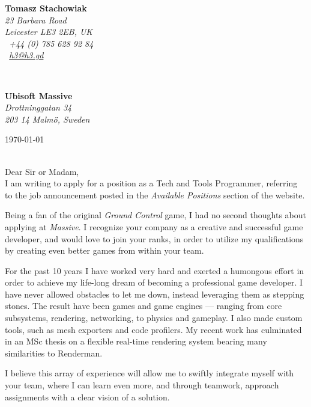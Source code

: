 \documentclass[11pt]{article}
\begin{document}
\hfill%
\begin{minipage}[t]{.6\textwidth}
\raggedleft%
{\bfseries Tomasz Stachowiak}\\[.35ex]
\small\itshape%
23 Barbara Road\\
Leicester LE3 2EB, UK\\[.35ex]
\Telefon~+44 (0) 785 628 92 84\\
\Letter~\href{mailto:h3@h3.gd}{h3@h3.gd}
\end{minipage}\\[1em]
%
\begin{minipage}[t]{.4\textwidth}
\raggedright%
{\bfseries Ubisoft Massive}\\[.35ex]
\small\itshape%
Drottninggatan 34\\
203 14 Malmö, Sweden
\end{minipage}
\hfill %
\begin{minipage}[t]{.4\textwidth}
\raggedleft %
\today
\end{minipage}\\[2em]
Dear Sir or Madam,\\[2.5em]
I am writing to apply for a position as a Tech and Tools Programmer, referring to the job announcement posted in the \emph{Available Positions} section of the website.

Being a fan of the original \emph{Ground Control} game, I had no second thoughts about applying at \emph{Massive}. I recognize your company as a creative and successful game developer, and would love to join your ranks, in order to utilize my qualifications by creating even better games from within your team.

For the past 10 years I have worked very hard and exerted a humongous effort in order to achieve my life-long dream of becoming a professional game developer. I have never allowed obstacles to let me down, instead leveraging them as stepping stones. The result have been games and game engines --- ranging from core subsystems, rendering, networking, to physics and gameplay. I also made custom tools, such as mesh exporters and code profilers. My recent work has culminated in an MSc thesis on a flexible real-time rendering system bearing many similarities to Renderman.

I believe this array of experience will allow me to swiftly integrate myself with your team, where I can learn even more, and through teamwork, approach assignments with a clear vision of a solution.
\end{document}
